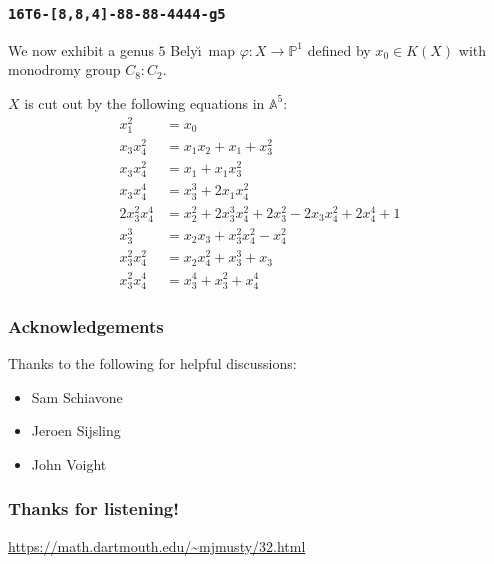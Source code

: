 \documentclass[xcolor=dvipsnames]{beamer}
\theoremstyle{plain}
\newcommand{\PP}{\mathbb P}
\newcommand{\Belyi}{Bely\u{\i}}
\begin{document}
  \begin{frame}[plain]
    \frametitle{\texttt{16T6-[8,8,4]-88-88-4444-g5}}
    \pause
    We now exhibit a genus $5$ \Belyi\ map $\varphi:X\to\PP^1$ defined by $x_0\in K(X)$
    with monodromy group $C_8:C_2$.
    \pause
    \par
    $X$ is cut out by the following equations in $\mathbb{A}^5$:
    \pause
    \begin{align*}
      x_1^2 &= x_0\\
      x_3x_4^2 &= x_1x_2+x_1+x_3^2\\
      x_3x_4^2 &= x_1+x_1x_3^2\\
      x_3x_4^4 &= x_3^3+2x_1x_4^2\\
      2x_3^2x_4^4 &= x_2^2+2x_3^3x_4^2+2x_3^2-2x_3x_4^2+2x_4^4+1\\
      x_3^3 &= x_2x_3+x_3^2x_4^2-x_4^2\\
      x_3^2x_4^2 &= x_2x_4^2+x_3^3+x_3\\
      x_3^2x_4^4 &= x_3^4+x_3^2+x_4^4
    \end{align*}
  \end{frame}
  \begin{frame}[plain]
    \frametitle{Acknowledgements}
    Thanks to the following for helpful discussions:
    \begin{itemize}
      \item Sam Schiavone
      \item Jeroen Sijsling
      \item John Voight
    \end{itemize}
  \end{frame}
  \begin{frame}[plain]
    \frametitle{Thanks for listening!}
    \url{https://math.dartmouth.edu/~mjmusty/32.html}
  \end{frame}
\end{document}
